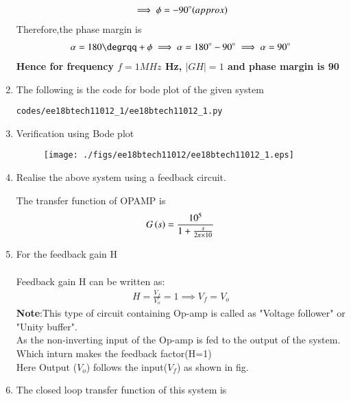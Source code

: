 \begin{enumerate}[label=\thesubsection.\arabic*.,ref=\thesubsection.\theenumi]
\begin{align}
\implies \phi = -90\degree (approx)
\end{align}
Therefore,the phase margin is
\begin{align}
    \alpha = 180\degrqq + \phi \implies \alpha = 180\degree - 90\degree\implies  \alpha = 90\degree
\end{align}
\textbf{Hence for frequency $f = 1 MHz$ Hz, $|GH| = 1$ and phase margin is 90\degree}
\item The following is the code for bode plot of the given system
\begin{lstlisting}
codes/ee18btech11012_1/ee18btech11012_1.py
\end{lstlisting}
\item Verification using Bode plot 
\begin{figure}[!h]
\centering
\texttt{[image: ./figs/ee18btech11012/ee18btech11012\_1.eps]}
\caption{}
\label{fig:ee18btech11012_1}
\end{figure}
\item Realise the above system using a feedback circuit.\\
\solution
\begin{figure}[ht!]
	\begin{center}
		\resizebox{\columnwidth/1}{!}{}
	\end{center}
	\caption{}
	\label{fig:ee18btech11012_fig1}
\end{figure}
The transfer function of OPAMP is
\begin{align}
    G\left(s\right) = \frac{10^{5}}{1+\frac{s}{2\pi \times 10}}
\end{align}
%
\item For the feedback gain H\\
\solution\\
Feedback gain H can be written as:
\begin{align}
         H = \frac{V_{f}}{V_{o}} = 1
\implies V_{f} = V_{o}
\end{align}
\textbf{Note}:This type of circuit containing Op-amp is called as "Voltage follower" or "Unity buffer".\\
As the non-inverting input of the Op-amp is fed to the output of the system.\\
Which inturn makes the feedback factor(H=1)\\
Here Output ($V_{o}$) follows the input($V_{f}$) as shown in fig.
\item The closed loop transfer function of this system is
\begin{align}

\end{align}
\end{enumerate}
